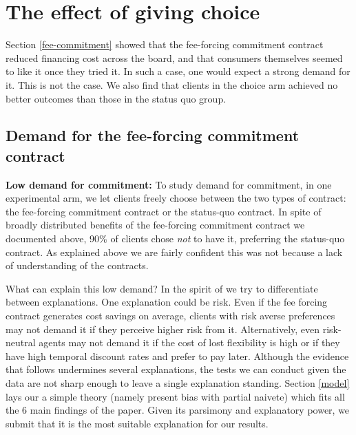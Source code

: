 \documentclass[oneside,11pt]{article}
\begin{document}
\section{The effect of giving choice} \label{fee-choice}

Section \ref{fee-commitment} showed that the fee-forcing commitment contract reduced financing cost across the board, and that consumers themselves seemed to like it once they tried it. In such a case, one would expect a strong demand for it. This is not the case. We also find that clients in the choice arm achieved no better outcomes than those in the status quo group.

\subsection{Demand for the fee-forcing commitment contract} \label{sec:demand}

\noindent \textbf{Low demand for commitment:} To study demand for commitment, in one experimental arm, we let clients freely choose between the two types of contract: the fee-forcing commitment contract or the status-quo contract. In spite of broadly distributed benefits of the fee-forcing commitment contract we documented above, 90\% of clients chose \textit{not} to have it, preferring the status-quo contract. As explained above we are fairly confident this was not because a lack of understanding of the contracts. 

\vspace{.1in}
\noindent What can explain this low demand? In the spirit of \cite{Blumenstock} we try to differentiate between explanations. One explanation could be risk. Even if the fee forcing contract generates cost savings on average, clients with risk averse preferences may not demand it if they perceive higher risk from it.   Alternatively, even risk-neutral agents may not demand it if the cost of lost flexibility is high or if they have high temporal discount rates and prefer to pay later. %
Although the evidence that follows undermines several explanations, the tests we can conduct given the data are not sharp enough to leave a single explanation standing. Section \ref{model} lays our a simple theory (namely present bias with partial naivete) which fits all the 6 main findings of the paper. Given its parsimony and explanatory power, we submit that it is the most suitable explanation for our results.
\end{document}
